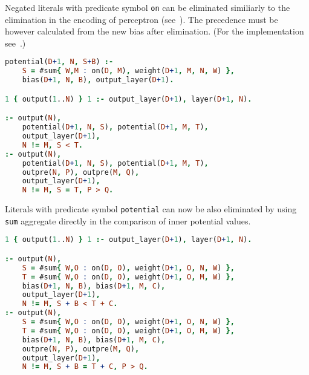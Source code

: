 Negated literals with predicate symbol \texttt{on} can be eliminated similiarly
to the elimination in the encoding of perceptron (see~). The precedence must be however
calculated from the new bias after elimination.
(For the implementation see~.)%
\label{sec:01-argmax}

\begin{code}
\begin{lstlisting}[language=Prolog, numbers=none]
potential(D+1, N, S+B) :-
    S = #sum{ W,M : on(D, M), weight(D+1, M, N, W) },
    bias(D+1, N, B), output_layer(D+1).

1 { output(1..N) } 1 :- output_layer(D+1), layer(D+1, N).

:- output(N),
    potential(D+1, N, S), potential(D+1, M, T),
    output_layer(D+1),
    N != M, S < T.
:- output(N),
    potential(D+1, N, S), potential(D+1, M, T),
    outpre(N, P), outpre(M, Q),
    output_layer(D+1),
    N != M, S = T, P > Q.
\end{lstlisting}
    \nobreak{}\label{enc:argmax_potential_01}
\end{code}

Literals with predicate symbol \texttt{potential} can now be also eliminated
by using \texttt{sum} aggregate directly in the comparison of inner potential values.

\begin{code}
\begin{lstlisting}[language=Prolog, numbers=none]
1 { output(1..N) } 1 :- output_layer(D+1), layer(D+1, N).

:- output(N),
    S = #sum{ W,O : on(D, O), weight(D+1, O, N, W) },
    T = #sum{ W,O : on(D, O), weight(D+1, O, M, W) },
    bias(D+1, N, B), bias(D+1, M, C),
    output_layer(D+1),
    N != M, S + B < T + C.
:- output(N),
    S = #sum{ W,O : on(D, O), weight(D+1, O, N, W) },
    T = #sum{ W,O : on(D, O), weight(D+1, O, M, W) },
    bias(D+1, N, B), bias(D+1, M, C),
    outpre(N, P), outpre(M, Q),
    output_layer(D+1),
    N != M, S + B = T + C, P > Q.
\end{lstlisting}
    \nobreak{}\label{enc:argmax_variable}
\end{code}

